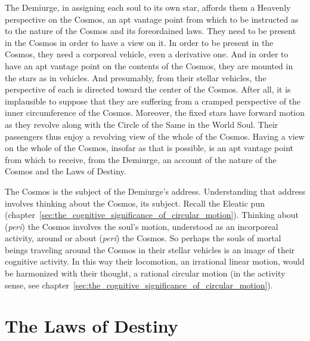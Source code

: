 The Demiurge, in assigning each soul to its own star, affords them a Heavenly perspective on the Cosmos, an apt vantage point from which to be instructed as to the nature of the Cosmos and its foreordained laws. They need to be present in the Cosmos in order to have a view on it. In order to be present in the Cosmos, they need a corporeal vehicle, even a derivative one. And in order to have an apt vantage point on the contents of the Cosmos, they are mounted in the stars as in vehicles. And presumably, from their stellar vehicles, the perspective of each is directed toward the center of the Cosmos. After all, it is implausible to suppose that they are suffering from a cramped perspective of the inner circumference of the Cosmos. Moreover, the fixed stars have forward motion as they revolve along with the Circle of the Same in the World Soul. Their passengers thus enjoy a revolving view of the whole of the Cosmos. Having a view on the whole of the Cosmos, insofar as that is possible, is an apt vantage point from which to receive, from the Demiurge, an account of the nature of the Cosmos and the Laws of Destiny. 

The Cosmos is the subject of the Demiurge's address. Understanding that address involves thinking about the Cosmos, its subject. Recall the Eleatic pun (chapter~\ref{sec:the_cognitive_significance_of_circular_motion}). Thinking about (\emph{peri}) the Cosmos involves the soul's motion, understood as an incorporeal activity, around or about (\emph{peri}) the Cosmos. So perhaps the souls of mortal beings traveling around the Cosmos in their stellar vehicles is an image of their cognitive activity. In this way their locomotion, an irrational linear motion, would be harmonized with their thought, a rational circular motion (in the activity sense, see chapter~\ref{sec:the_cognitive_significance_of_circular_motion}).



\section{The Laws of Destiny} %
\label{sec:the_laws_of_destiny}


